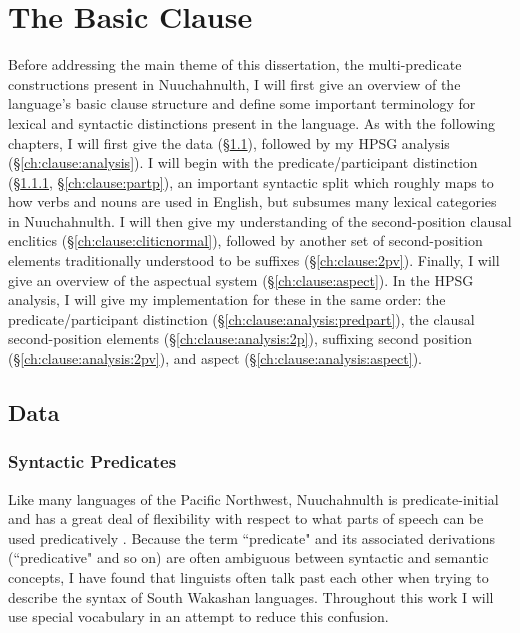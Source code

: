 \chapter{The Basic Clause} \label{ch:clause}

Before addressing the main theme of this dissertation, the multi-predicate constructions present in Nuuchahnulth, I will first give an overview of the language's basic clause structure and define some important terminology for lexical and syntactic distinctions present in the language. As with the following chapters, I will first give the data (\S\ref{ch:clause:data}), followed by my HPSG analysis (\S\ref{ch:clause:analysis}). I will begin with the predicate/participant distinction (\S\ref{ch:clause:predp}, \S\ref{ch:clause:partp}), an important syntactic split which roughly maps to how verbs and nouns are used in English, but subsumes many lexical categories in Nuuchahnulth. I will then give my understanding of the second-position clausal enclitics (\S\ref{ch:clause:cliticnormal}), followed by another set of second-position elements traditionally understood to be suffixes (\S\ref{ch:clause:2pv}). Finally, I will give an overview of the aspectual system (\S\ref{ch:clause:aspect}). In the HPSG analysis, I will give my implementation for these in the same order: the predicate/participant distinction (\S\ref{ch:clause:analysis:predpart}), the clausal second-position elements (\S\ref{ch:clause:analysis:2p}), suffixing second position (\S\ref{ch:clause:analysis:2pv}), and aspect (\S\ref{ch:clause:analysis:aspect}).

\section{Data} \label{ch:clause:data}

\subsection{Syntactic Predicates} \label{ch:clause:predp}

Like many languages of the Pacific Northwest, Nuuchahnulth is predicate-initial and has a great deal of flexibility with respect to what parts of speech can be used predicatively \citep{sapir1911, swadesh1938, jacobsen1979}. Because the term ``predicate" and its associated derivations (``predicative" and so on) are often ambiguous between syntactic and semantic concepts, I have found that linguists often talk past each other when trying to describe the syntax of South Wakashan languages. Throughout this work I will use special vocabulary in an attempt to reduce this confusion.

